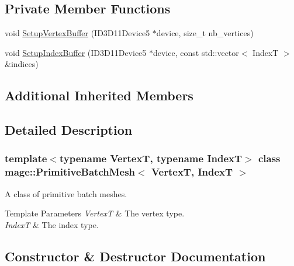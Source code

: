 \subsection*{Private Member Functions}
\begin{DoxyCompactItemize}
\item 
void \hyperlink{classmage_1_1_primitive_batch_mesh_aecc11382e4d0c0b9a042a44f48e5bae4}{Setup\+Vertex\+Buffer} (I\+D3\+D11\+Device5 $\ast$device, size\+\_\+t nb\+\_\+vertices)
\item 
void \hyperlink{classmage_1_1_primitive_batch_mesh_a05f64f7de034c5c5e29dc6bfb220e85e}{Setup\+Index\+Buffer} (I\+D3\+D11\+Device5 $\ast$device, const std\+::vector$<$ IndexT $>$ \&indices)
\end{DoxyCompactItemize}
\subsection*{Additional Inherited Members}


\subsection{Detailed Description}
\subsubsection*{template$<$typename VertexT, typename IndexT$>$\newline
class mage\+::\+Primitive\+Batch\+Mesh$<$ Vertex\+T, Index\+T $>$}

A class of primitive batch meshes.


\begin{DoxyTemplParams}{Template Parameters}
{\em VertexT} & The vertex type. \\
\hline
{\em IndexT} & The index type. \\
\hline
\end{DoxyTemplParams}


\subsection{Constructor \& Destructor Documentation}
\hypertarget{classmage_1_1_primitive_batch_mesh_a28a2a7c043d384d823bcc27ec44e2434}{}\label{classmage_1_1_primitive_batch_mesh_a28a2a7c043d384d823bcc27ec44e2434} 
